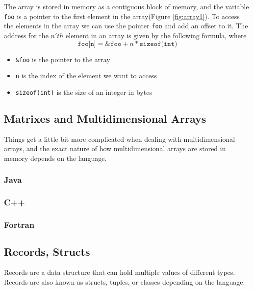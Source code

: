 The array is stored in memory as a contiguous block of memory, and the variable \texttt{foo} is a pointer to the first element in the array(Figure \ref{fig:array1}).
To access the elements in the array we can use the pointer \texttt{foo} and add an offset to it.
The address for the $n'th$ element in an array is given by the following formula, where
\begin{equation*}
    \texttt{foo[n]} = \texttt{\&foo} + n * \texttt{sizeof(int)}
\end{equation*}
\begin{itemize}
    \item \texttt{\&foo} is the pointer to the array
    \item \texttt{n} is the index of the element we want to access
    \item \texttt{sizeof(int)} is the size of an integer in bytes
\end{itemize}


\subsection{Matrixes and Multidimensional Arrays}
Things get a little bit more complicated when dealing with multidimensional arrays, and the exact nature of how multidimensional arrays are stored in memory depends on the language.
\subsubsection{Java}
\subsubsection{C++}
\subsubsection{Fortran}
\subsection{Records, Structs}
Records are a data structure that can hold multiple values of different types.
Records are also known as structs, tuples, or classes depending on the language.

